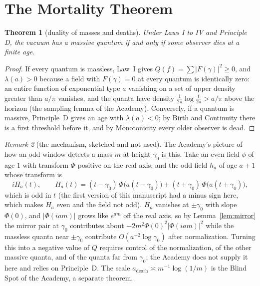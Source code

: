 \documentclass[11pt]{article}
\newtheorem{theorem}{Theorem}[section]
\theoremstyle{definition}
\theoremstyle{remark}
\newtheorem{remark}[theorem]{Remark}
\begin{document}
\section{The Mortality Theorem}

\begin{theorem}[duality of masses and deaths]\label{thm:mortality}
Under Laws I to IV and Principle D, the vacuum has a massive quantum if and only if some observer dies at a finite age.
\end{theorem}

\begin{proof}
If every quantum is massless, Law~I gives $Q(f)=\sum|F(\gamma)|^2\ge0$, and $\lambda(a)>0$ because a field with $F(\gamma)=0$ at every quantum is identically zero: an entire function of exponential type $a$ vanishing on a set of upper density greater than $a/\pi$ vanishes, and the quanta have density $\frac1{2\pi}\log\frac t{2\pi}>a/\pi$ above the horizon (the sampling lemma of the Academy). Conversely, if a quantum is massive, Principle~D gives an age with $\lambda(a)<0$; by Birth and Continuity there is a first threshold before it, and by Monotonicity every older observer is dead.
\end{proof}

\begin{remark}[the mechanism, sketched and not used]\label{rem:mech}
The Academy's picture of how an odd window detects a mass $m$ at height $\gamma_0$ is this. Take an even field $\phi$ of age $1$ with transform $\Phi$ positive on the real axis, and the odd field $h_a$ of age $a+1$ whose transform is
\[
iH_a(t),\qquad H_a(t)=(t-\gamma_0)\,\Phi\big(a(t-\gamma_0)\big)+(t+\gamma_0)\,\Phi\big(a(t+\gamma_0)\big),
\]
which is odd in $t$ (the first version of this manuscript had a minus sign here, which makes $H_a$ even and the field not odd). $H_a$ vanishes at $\pm\gamma_0$ with slope $\Phi(0)$, and $|\Phi(iam)|$ grows like $e^{am}$ off the real axis, so by Lemma~\ref{lem:mirror} the mirror pair at $\gamma_0$ contributes about $-2m^2\Phi(0)^2|\Phi(iam)|^2$ while the massless quanta near $\pm\gamma_0$ contribute $O(a^{-2}\log\gamma_0)$ after normalization. Turning this into a negative value of $Q$ requires control of the normalization, of the other massive quanta, and of the quanta far from $\gamma_0$; the Academy does not supply it here and relies on Principle~D. The scale $a_{\mathrm{death}}\asymp m^{-1}\log(1/m)$ is the Blind Spot of the Academy, a separate theorem.
\end{remark}
\end{document}
